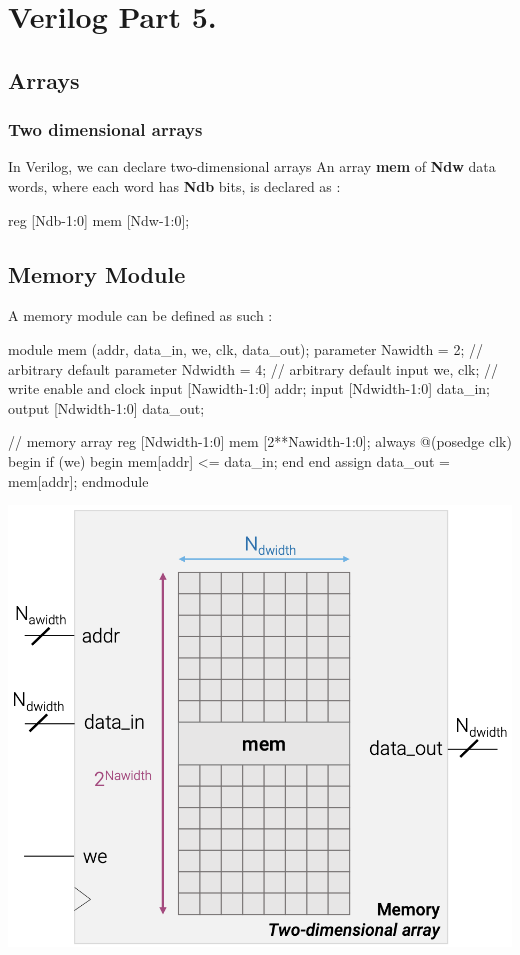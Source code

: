 \documentclass[12pt,openany]{book}
\begin{document}
\section{Verilog Part 5.}
\subsection{Arrays}
\subsubsection{Two dimensional arrays}
In Verilog, we can declare two-dimensional arrays
An array \textbf{mem} of \textbf{Ndw} data words, where each word has \textbf{Ndb} bits, is declared as :
\begin{center}
	\begin{vhdl}
reg [Ndb-1:0] mem [Ndw-1:0];
	\end{vhdl}
\end{center}

\subsection{Memory Module}
A memory module can be defined as such :\newline
\vspace*{5px}
\begin{minipage}{0.45\textwidth}
	\begin{vhdl}
module mem (addr, data_in, we, clk, data_out);
	parameter Nawidth = 2; // arbitrary default
	parameter Ndwidth = 4; // arbitrary default
	input we, clk; // write enable and clock
	input [Nawidth-1:0] addr;
	input [Ndwidth-1:0] data_in;
	output [Ndwidth-1:0] data_out;

	// memory array
	reg [Ndwidth-1:0] mem [2**Nawidth-1:0];
	always @(posedge clk) begin
	if (we) begin
		mem[addr] <= data_in;
	end
	end
	assign data_out = mem[addr];
endmodule
\end{vhdl}
\end{minipage}
\hfill
\vline
\hfill
\begin{minipage}[htp]{0.45\textwidth}
	\centering
	\includegraphics[width=1\textwidth]{circuits/16.2.4.png}
\end{minipage}
\end{document}
